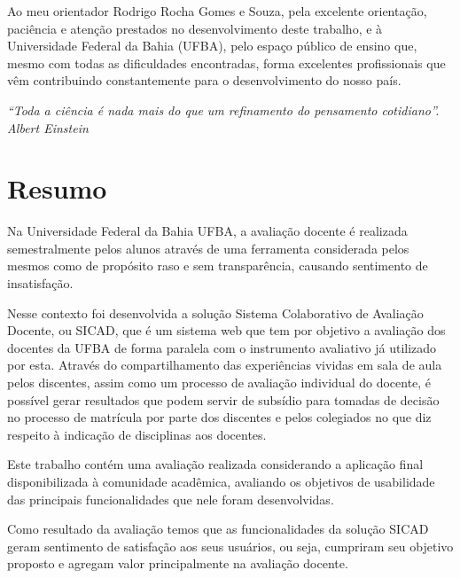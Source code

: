 \documentclass[12pt, a4paper]{report}
\begin{document}
Ao meu orientador Rodrigo Rocha Gomes e Souza, pela excelente orientação, paciência e atenção prestados no desenvolvimento deste trabalho, e à Universidade Federal da Bahia (UFBA), pelo espaço público de ensino que, mesmo com todas as dificuldades encontradas, forma excelentes profissionais que vêm contribuindo constantemente para o desenvolvimento do nosso país.  

\thispagestyle{empty} 
\newpage
\vspace*{20cm}
\begin{flushright}
\begin{minipage}{8cm}
\begin{flushright}
\textit{
``Toda a ciência é nada mais do que um refinamento do pensamento cotidiano''. \\
Albert Einstein}
\end{flushright}
\end{minipage}
\end{flushright}
\thispagestyle{empty} 

\newpage
\chapter*{Resumo}
Na Universidade Federal da Bahia \ac{UFBA}, a avaliação docente é realizada semestralmente pelos alunos através de uma ferramenta considerada pelos mesmos como de propósito raso e sem transparência, causando sentimento de insatisfação. 

Nesse contexto foi desenvolvida a solução Sistema Colaborativo de Avaliação Docente, ou SICAD, que é um sistema web que tem por objetivo a avaliação dos docentes da \ac{UFBA} de forma paralela com o instrumento avaliativo já utilizado por esta. Através do compartilhamento das experiências vividas em sala de aula pelos discentes, assim como um processo de avaliação individual do docente, é possível gerar resultados que podem servir de subsídio para tomadas de decisão no processo de matrícula por parte dos discentes e pelos colegiados no que diz respeito à indicação de disciplinas aos docentes.

Este trabalho contém  uma avaliação realizada considerando a  aplicação final disponibilizada à comunidade acadêmica, avaliando os objetivos de usabilidade das principais funcionalidades que nele foram desenvolvidas.

Como resultado da avaliação temos que as funcionalidades da solução \ac{SICAD} geram sentimento de satisfação aos seus usuários, ou seja, cumpriram seu objetivo proposto e agregam valor principalmente na avaliação docente.
\end{document}

